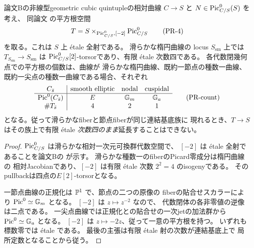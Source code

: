 \begin{proposition}[適合Picard平方根の幾何fiberの濃度]
\label{prop:qa-picard-roots-degeneration-count}
論文Bの非線型geometric cubic quintupleの相対曲線
$C\to S$ と $N\in\operatorname{Pic}^0_{C/S}(S)$ を考え、
同論文 \cite[\texttt{lem:picard-halves}]{QuadricModuli2026}
の平方根空間
\[
 T=S\times_{\operatorname{Pic}^0_{C/S},[-2]}\operatorname{Pic}^0_{C/S}
 \tag{PR-4}\label{eq:qa-picard-root-torsor}
\]
を取る。これは $S$ 上 étale 全射である。
滑らかな楕円曲線の locus $S_{\mathrm{sm}}$ 上では
$T_{S_{\mathrm{sm}}}\to S_{\mathrm{sm}}$ は
$\operatorname{Pic}^0_{C/S}[2]$-torsorであり、有限 étale 次数四である。
各代数閉幾何点での平方根の個数は、曲線が
滑らかな楕円曲線、既約一節点の種数一曲線、
既約一尖点の種数一曲線である場合、それぞれ
\[
 \begin{array}{c|ccc}
 C_{\bar s}&\text{smooth elliptic}&\text{nodal}&\text{cuspidal}\\ \hline
 \operatorname{Pic}^0(C_{\bar s})&E&\mathbb G_m&\mathbb G_a\\
 \#T_{\bar s}&4&2&1
 \end{array}
 \tag{PR-count}\label{eq:qa-picard-root-count}
\]
となる。従って滑らかなfiberと節点fiberが同じ連結基底族に
現れるとき、$T\to S$ はその族上で有限 étale
\emph{次数四のまま}延長することはできない。
\end{proposition}
\begin{proof}
$\operatorname{Pic}^0_{C/S}$ は滑らかな相対一次元可換群代数空間で、
$[-2]$ は étale 全射であることを論文Bの
\cite[\texttt{lem:picard-halves}]{QuadricModuli2026} が示す。
滑らかな種数一のfiberのPicard零成分は楕円曲線の
相対Jacobianであり、$[-2]$ は有限 étale
次数 $2^{2}=4$ のisogenyである。
そのpullbackは四点の$E[2]$-torsorとなる。

一節点曲線の正規化は $\mathbb P^1$ で、節点の二つの原像の
fiberの貼合せスカラーにより
$\operatorname{Pic}^0\simeq\mathbb G_m$ となる。
$[-2]$ は $z\mapsto z^{-2}$ なので、
代数閉体の各非零値の逆像は二点である。
一尖点曲線では正規化との貼合せの一次jetの加法群から
$\operatorname{Pic}^0\simeq\mathbb G_a$ となる。
$[-2]$ は $z\mapsto-2z$、従って一意の平方根を持つ。
いずれも標数零では étale である。
最後の主張は有限 étale 射の次数が連結基底上で
局所定数となることから従う。
\end{proof}

